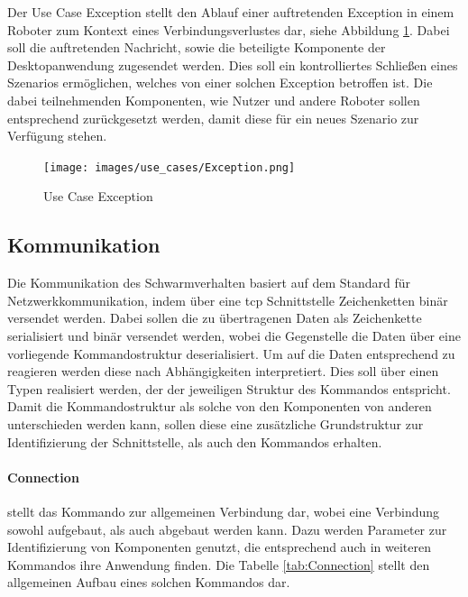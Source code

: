 Der Use Case Exception stellt den Ablauf einer auftretenden Exception in einem Roboter zum Kontext eines Verbindungsverlustes dar, siehe Abbildung \ref{fig:Exception}. Dabei soll die auftretenden Nachricht, sowie die beteiligte Komponente der Desktopanwendung zugesendet werden. Dies soll ein kontrolliertes Schließen eines Szenarios ermöglichen, welches von einer solchen Exception betroffen ist. Die dabei teilnehmenden Komponenten, wie Nutzer und andere Roboter sollen entsprechend zurückgesetzt werden, damit diese für ein neues Szenario zur Verfügung stehen.\\

\begin{figure}[h]
	\begin{center}
		\texttt{[image: images/use\_cases/Exception.png]}
	\end{center}
	\caption{Use Case Exception}
	\label{fig:Exception}
\end{figure}

\newpage
\color{process}
\subsection{Kommunikation}\label{kommunikation}

Die Kommunikation des Schwarmverhalten basiert auf dem Standard für Netzwerkkommunikation, indem über eine \gls{tcp} Schnittstelle Zeichenketten binär versendet werden. Dabei sollen die zu übertragenen Daten als Zeichenkette serialisiert und binär versendet werden, wobei die Gegenstelle die Daten über eine vorliegende Kommandostruktur deserialisiert. Um auf die Daten entsprechend zu reagieren werden diese nach Abhängigkeiten interpretiert. Dies soll über einen Typen realisiert werden, der der jeweiligen Struktur des Kommandos entspricht. Damit die Kommandostruktur als solche von den Komponenten von anderen unterschieden werden kann, sollen diese eine zusätzliche Grundstruktur zur Identifizierung der Schnittstelle, als auch den Kommandos erhalten. 

\paragraph{Connection} stellt das Kommando zur allgemeinen Verbindung dar, wobei eine Verbindung sowohl aufgebaut, als auch abgebaut werden kann. Dazu werden Parameter zur Identifizierung von Komponenten genutzt, die entsprechend auch in weiteren Kommandos ihre Anwendung finden. Die Tabelle \ref{tab:Connection} stellt den allgemeinen Aufbau eines solchen Kommandos dar.

